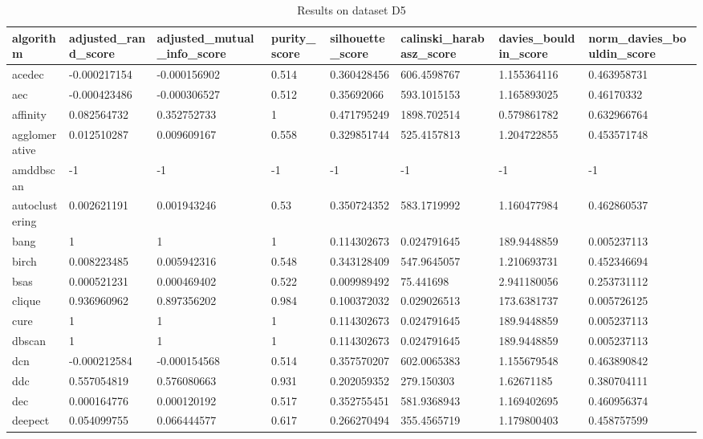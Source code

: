 \begin{table}[H]
\centering
\caption{Results on dataset D5}
\label{S58_Table}
\begin{tabular}{|l|l|l|l|l|l|l|l|}
\hline
algorithm & adjusted\_rand\_score & adjusted\_mutual\_info\_score & purity\_score & silhouette\_score & calinski\_harabasz\_score & davies\_bouldin\_score & norm\_davies\_bouldin\_score \\
\hline
acedec & -0.000217154 & -0.000156902 & 0.514 & 0.360428456 & 606.4598767 & 1.155364116 & 0.463958731 \\
\hline
aec & -0.000423486 & -0.000306527 & 0.512 & 0.35692066 & 593.1015153 & 1.165893025 & 0.46170332 \\
\hline
affinity & 0.082564732 & 0.352752733 & 1 & 0.471795249 & 1898.702514 & 0.579861782 & 0.632966764 \\
\hline
agglomerative & 0.012510287 & 0.009609167 & 0.558 & 0.329851744 & 525.4157813 & 1.204722855 & 0.453571748 \\
\hline
amddbscan & -1 & -1 & -1 & -1 & -1 & -1 & -1 \\
\hline
autoclustering & 0.002621191 & 0.001943246 & 0.53 & 0.350724352 & 583.1719992 & 1.160477984 & 0.462860537 \\
\hline
bang & 1 & 1 & 1 & 0.114302673 & 0.024791645 & 189.9448859 & 0.005237113 \\
\hline
birch & 0.008223485 & 0.005942316 & 0.548 & 0.343128409 & 547.9645057 & 1.210693731 & 0.452346694 \\
\hline
bsas & 0.000521231 & 0.000469402 & 0.522 & 0.009989492 & 75.441698 & 2.941180056 & 0.253731112 \\
\hline
clique & 0.936960962 & 0.897356202 & 0.984 & 0.100372032 & 0.029026513 & 173.6381737 & 0.005726125 \\
\hline
cure & 1 & 1 & 1 & 0.114302673 & 0.024791645 & 189.9448859 & 0.005237113 \\
\hline
dbscan & 1 & 1 & 1 & 0.114302673 & 0.024791645 & 189.9448859 & 0.005237113 \\
\hline
dcn & -0.000212584 & -0.000154568 & 0.514 & 0.357570207 & 602.0065383 & 1.155679548 & 0.463890842 \\
\hline
ddc & 0.557054819 & 0.576080663 & 0.931 & 0.202059352 & 279.150303 & 1.62671185 & 0.380704111 \\
\hline
dec & 0.000164776 & 0.000120192 & 0.517 & 0.352755451 & 581.9368943 & 1.169402695 & 0.460956374 \\
\hline
deepect & 0.054099755 & 0.066444577 & 0.617 & 0.266270494 & 355.4565719 & 1.179800403 & 0.458757599 \\

\end{tabular}
\end{table}
